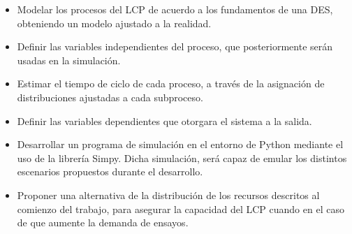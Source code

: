 \begin{itemize}
	\item Modelar los procesos del LCP
		de acuerdo a los fundamentos de una DES,
		obteniendo un modelo ajustado a la realidad.
	\item Definir las variables independientes del proceso,
		que posteriormente serán usadas en la simulación.
	\item Estimar el tiempo de ciclo de cada proceso,
		a través de la asignación de
		distribuciones ajustadas a cada subproceso.
	\item Definir las variables dependientes
		que otorgara el sistema a la salida.
	\item Desarrollar un programa de simulación en el entorno de Python
		mediante el uso de la librería Simpy.
		Dicha simulación, será capaz de emular
		los distintos escenarios propuestos durante el desarrollo.
	\item Proponer una alternativa de la distribución de
		los recursos descritos al comienzo del trabajo, 
		para asegurar la capacidad del LCP cuando en el caso de que aumente la
		demanda de ensayos.
\end{itemize}
